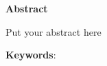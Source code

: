 \cleardoublepage{}
\thispagestyle{plain}
\vspace*{\fill} %
{\begin{center}
    \huge\textbf{Abstract}
\end{center}}
\vspace*{0.05\textheight}

Put your abstract here

\noindent\textbf{Keywords}: \getKeywords{}
\vfill %
\newpage
